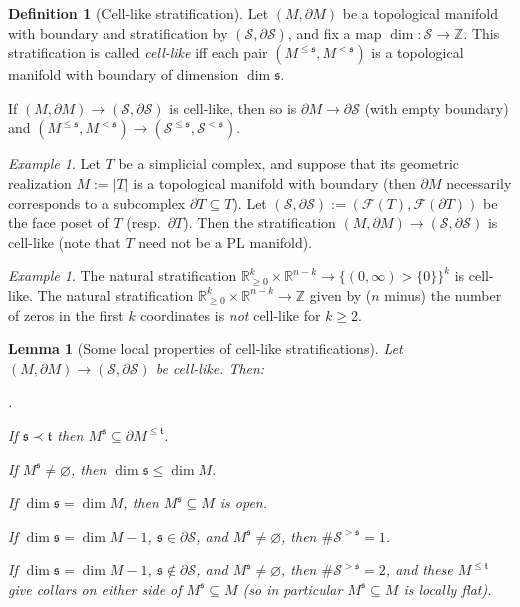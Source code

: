 \documentclass[12pt]{article}
\newtheorem{lemma}[theorem]{Lemma}
\theoremstyle{definition}
\newtheorem{definition}[theorem]{Definition}
\theoremstyle{remark}
\newtheorem{example}[theorem]{Example}
\numberwithin{equation}{subsection}
\newcommand{\F}{\mathcal F}
\newcommand{\s}{\mathfrak s}
\newcommand{\ttt}{\mathfrak t}
\newcommand{\ZZ}{\mathbb Z}
\newcommand{\RR}{\mathbb R}
\newcommand{\SSS}{\mathcal S}
\newcounter{rcounti}
\newenvironment{rlist}{\begin{list}{\roman{rcounti}.}{\usecounter{rcounti}
\setlength\itemsep{0pt}
\setlength\labelsep{4pt}
\setlength\labelwidth{16pt}
\setlength\leftmargin{32pt}
\setlength\listparindent{0pt}
\setlength\parsep{0pt}
\setlength\parskip{0pt}
\setlength\partopsep{0pt}
\setlength\rightmargin{0pt}
\setlength\topsep{0pt}
\setlength\itemindent{0pt}
}}{\end{list}}
\begin{document}
\begin{definition}[Cell-like stratification]\label{celllikedef}
Let $(M,\partial M)$ be a topological manifold with boundary and stratification by $(\SSS,\partial\SSS)$, and fix a map $\dim:\SSS\to\ZZ$.  This stratification is called \emph{cell-like} iff each pair $(M^{\leq\s},M^{<\s})$ is a topological manifold with boundary of dimension $\dim\s$.

If $(M,\partial M)\to(\SSS,\partial\SSS)$ is cell-like, then so is $\partial M\to\partial\SSS$ (with empty boundary) and $(M^{\leq\s},M^{<\s})\to(\SSS^{\leq\s},\SSS^{<\s})$.
\end{definition}

\begin{example}\label{celllikeexample}
Let $T$ be a simplicial complex, and suppose that its geometric realization $M:=\left|T\right|$ is a topological manifold with boundary (then $\partial M$ necessarily corresponds to a subcomplex $\partial T\subseteq T$).  Let $(\SSS,\partial\SSS):=(\F(T),\F(\partial T))$ be the face poset of $T$ (resp.\ $\partial T$).  Then the stratification $(M,\partial M)\to(\SSS,\partial\SSS)$ is cell-like (note that $T$ need not be a PL manifold).
\end{example}

\begin{example}\label{celllikecornerexample}
The natural stratification $\RR_{\geq 0}^k\times\RR^{n-k}\to\{(0,\infty)>\{0\}\}^k$ is cell-like.  The natural stratification $\RR_{\geq 0}^k\times\RR^{n-k}\to\ZZ$ given by ($n$ minus) the number of zeros in the first $k$ coordinates is \emph{not} cell-like for $k\geq 2$.
\end{example}

\begin{lemma}[Some local properties of cell-like stratifications]\label{celllikelocalstructure}
Let $(M,\partial M)\to(\SSS,\partial\SSS)$ be cell-like.  Then:
\begin{rlist}
\item\label{inbdry}If $\s\prec\ttt$ then $M^\s\subseteq\partial M^{\leq\ttt}$.
\item\label{toplessdim}If $M^\s\ne\varnothing$, then $\dim\s\leq\dim M$.
\item\label{topopen}If $\dim\s=\dim M$, then $M^\s\subseteq M$ is open.
\item\label{bdrystratumstruct}If $\dim\s=\dim M-1$, $\s\in\partial\SSS$, and $M^\s\ne\varnothing$, then $\#\SSS^{>\s}=1$.
\item\label{intstratumstruct}If $\dim\s=\dim M-1$, $\s\notin\partial\SSS$, and $M^\s\ne\varnothing$, then $\#\SSS^{>\s}=2$, and these $M^{\leq\ttt}$ give collars on either side of $M^\s\subseteq M$ (so in particular $M^\s\subseteq M$ is locally flat).
\end{rlist}
\end{lemma}
\end{document}
